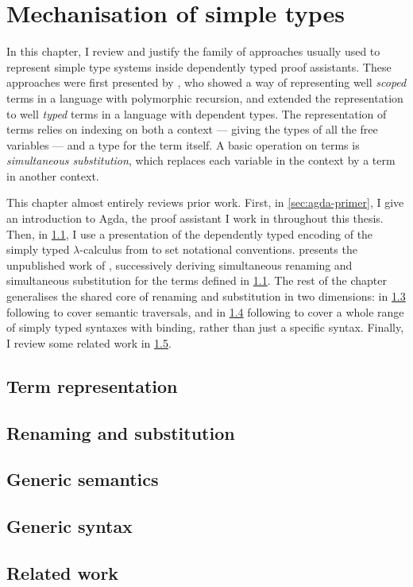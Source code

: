 \chapter{Mechanisation of simple types}\label{sec:simple}

In this chapter, I review and justify the family of approaches usually used to
represent simple type systems inside dependently typed proof assistants.
These approaches were first presented by \citet{AR99}, who showed a way of
representing well \emph{scoped} terms in a language with polymorphic recursion,
and extended the representation to well \emph{typed} terms in a language with
dependent types.
The representation of terms relies on indexing on both a context --- giving the
types of all the free variables --- and a type for the term itself.
A basic operation on terms is \emph{simultaneous substitution}, which replaces
each variable in the context by a term in another context.

This chapter almost entirely reviews prior work.
First, in \cref{sec:agda-primer}, I give an introduction to Agda, the proof
assistant I work in throughout this thesis.
Then, in \cref{sec:terms}, I use a presentation of the dependently typed
encoding of the simply typed $\lambda$-calculus from \citet{AR99} to set
notational conventions.
 presents the unpublished work of \citet{McBride05},
successively deriving simultaneous renaming and simultaneous substitution for
the terms defined in \cref{sec:terms}.
The rest of the chapter generalises the shared core of renaming and substitution
in two dimensions: in \cref{sec:gen-sem} following \citet{ACMM17} to cover
semantic traversals, and in \cref{sec:gen-syn} following \citet{AACMM21} to
cover a whole range of simply typed syntaxes with binding, rather than just
a specific syntax.
Finally, I review some related work in \cref{sec:mech-related}.


\section{Term representation}\label{sec:terms}

\section{Renaming and substitution}\label{sec:kits}

\section{Generic semantics}\label{sec:gen-sem}

\section{Generic syntax}\label{sec:gen-syn}

%
\section{Related work}\label{sec:mech-related}

